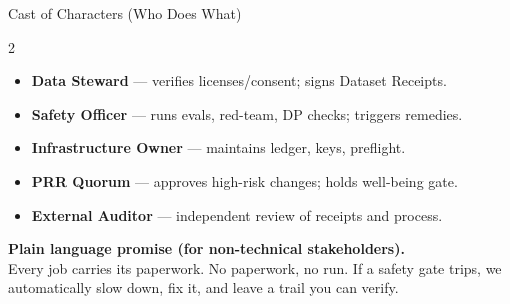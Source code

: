 \documentclass[11pt]{article}
\begin{document}
\begin{panelB}{Cast of Characters (Who Does What)}
\begin{multicols}{2}
\begin{itemize}
  \item \textbf{Data Steward} — verifies licenses/consent; signs Dataset Receipts.
  \item \textbf{Safety Officer} — runs evals, red-team, DP checks; triggers remedies.
  \item \textbf{Infrastructure Owner} — maintains ledger, keys, preflight.
  \item \textbf{PRR Quorum} — approves high-risk changes; holds well-being gate.
  \item \textbf{External Auditor} — independent review of receipts and process.
\end{itemize}
\columnbreak
\begin{callout}
\textbf{Plain language promise (for non-technical stakeholders).}\\
Every job carries its paperwork. No paperwork, no run. If a safety gate trips, we automatically slow down, fix it, and leave a trail you can verify.
\end{callout}
\end{multicols}
\end{panelB}
\end{document}
